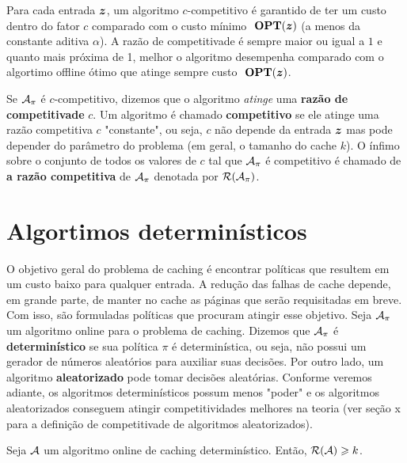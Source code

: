 Para cada entrada \(\bm{z}\), um algoritmo \(c\)-competitivo é garantido de ter um custo dentro do fator \(c\) comparado com o custo mínimo \(\ \textbf{OPT}(\bm{z})\) (a menos da constante aditiva \(\alpha\)). A razão de competitivade é sempre maior ou igual a \(1\) e quanto mais próxima de 1, melhor o algoritmo desempenha comparado com o algortimo offline ótimo que atinge sempre custo \(\ \textbf{OPT}(\bm{z})\).

Se \(\mathcal{A}_\pi\) é \(c\)-competitivo, dizemos que o algoritmo \emph{atinge} uma \textbf{razão de competitivade} \(c\). Um algoritmo é chamado \textbf{competitivo} se ele atinge uma razão competitiva \(c\) "constante", ou seja, \(c\) não depende da entrada \(\bm{z}\) mas pode depender do parâmetro do problema (em geral, o tamanho do cache \(k\)). O ínfimo sobre o conjunto de todos os valores de \(c\) tal que \(\mathcal{A}_\pi\) é competitivo é chamado de \textbf{a razão competitiva} de \(\mathcal{A}_\pi\) denotada por \(\mathcal{R}(\mathcal{A}_\pi)\).

\section{Algortimos determinísticos}

O objetivo geral do problema de caching é encontrar políticas que resultem em um custo baixo para qualquer entrada. A redução das falhas de cache depende, em grande parte, de manter no cache as páginas que serão requisitadas em breve. Com isso, são formuladas políticas que procuram atingir esse objetivo. Seja \(\mathcal{A}_\pi\) um algoritmo online para o problema de caching. Dizemos que \(\mathcal{A}_\pi\) é \textbf{determinístico} se sua política \(\pi\) é determinística, ou seja, não possui um gerador de números aleatórios para auxiliar suas decisões. Por outro lado, um algoritmo \textbf{aleatorizado} pode tomar decisões aleatórias. Conforme veremos adiante, os algoritmos determinísticos possum menos "poder" e os algoritmos aleatorizados conseguem atingir competitividades melhores na teoria (ver seção x para a definição de competitivade de algoritmos aleatorizados). 

\begin{theorem}
\label{teo:cota_det}
Seja \(\mathcal{A}\) um algoritmo online de caching determinístico. Então, \(\mathcal{R}(\mathcal{A}) \geqslant k\).
\end{theorem}


